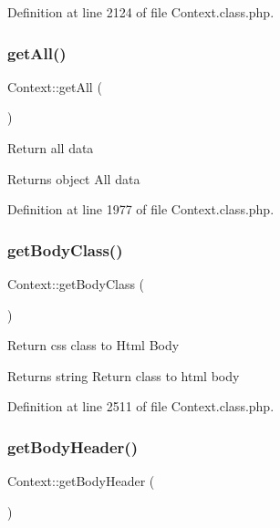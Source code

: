Definition at line 2124 of file Context.\+class.\+php.

\mbox{\label{classContext_a89ad6fd5c093e257e82822d16dc67ac4}} 
\subsubsection{\texorpdfstring{get\+All()}{getAll()}}
{\footnotesize\ttfamily Context\+::get\+All (\begin{DoxyParamCaption}{ }\end{DoxyParamCaption})}

Return all data

\begin{DoxyReturn}{Returns}
object All data 
\end{DoxyReturn}


Definition at line 1977 of file Context.\+class.\+php.

\mbox{\label{classContext_a6562a2a894b2142362640e512bcf4e09}} 
\subsubsection{\texorpdfstring{get\+Body\+Class()}{getBodyClass()}}
{\footnotesize\ttfamily Context\+::get\+Body\+Class (\begin{DoxyParamCaption}{ }\end{DoxyParamCaption})}

Return css class to Html Body

\begin{DoxyReturn}{Returns}
string Return class to html body 
\end{DoxyReturn}


Definition at line 2511 of file Context.\+class.\+php.

\mbox{\label{classContext_a991c9fc6985b78d817b6771092913975}} 
\subsubsection{\texorpdfstring{get\+Body\+Header()}{getBodyHeader()}}
{\footnotesize\ttfamily Context\+::get\+Body\+Header (\begin{DoxyParamCaption}{ }\end{DoxyParamCaption})}

